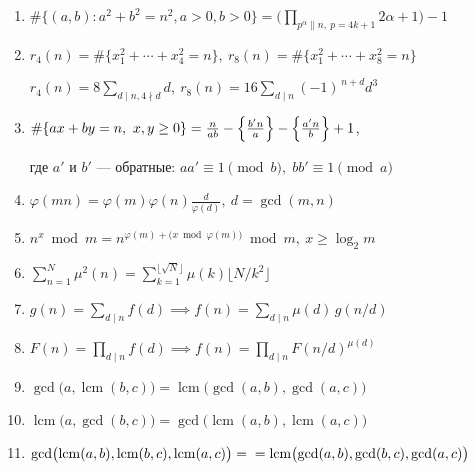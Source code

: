 \begin{enumerate}
\item %
$\displaystyle \#\{(a,b):a^2+b^2=n^2,a>0,b>0\}
=\Big(\prod_{p^\alpha\parallel n,\ p = 4k+1}2\alpha+1\Big)-1$

\item %
$r_4(n)=\#\{x_1^2+\cdots+x_4^2=n\},\ 
r_8(n)=\#\{x_1^2+\cdots+x_8^2=n\}$

$r_4(n)=8\sum_{d\mid n, 4\nmid d}d,\ 
r_8(n)=16\sum_{d\mid n}(-1)^{\,n+d}d^3$

\item %
$\#\{ax+by=n,\ x,y\ge0\}=\frac{n}{ab}-\Bigl\{\tfrac{b'n}{a}\Bigr\}-\Bigl\{\tfrac{a'n}{b}\Bigr\}+1$,

где $a'$ и $b'$ — обратные: $aa'\equiv1\pmod b,\; bb'\equiv1\pmod a$

\item %
$\varphi(mn)=\varphi(m)\varphi(n)\frac{d}{\varphi(d)},\  d=\gcd(m,n)$

\item %
$n^x\bmod m = n^{\varphi(m)+\bigl(x\bmod\varphi(m)\bigr)}\bmod m,\ x\ge\log_2 m$

\item %
$\sum_{n=1}^N\mu^2(n)=\sum_{k=1}^{\lfloor\sqrt N\rfloor}\mu(k)\bigl\lfloor N/k^2\bigr\rfloor$

\item %
$g(n)=\sum_{d\mid n}f(d) \implies f(n)=\sum_{d\mid n}\mu(d)\,g(n/d)$

\item %
$F(n)=\prod_{d\mid n}f(d) \implies f(n)=\prod_{d\mid n}F(n/d)^{\mu(d)}$

\item %
$\gcd\bigl(a,\operatorname{lcm}(b,c)\bigr)=\operatorname{lcm}\bigl(\gcd(a,b),\gcd(a,c)\bigr)$

\item %
$\operatorname{lcm}\bigl(a,\gcd(b,c)\bigr)=\gcd\bigl(\operatorname{lcm}(a,b),\operatorname{lcm}(a,c)\bigr)$

\item %
$\gcd\bigl(\operatorname{lcm}(a,b),\operatorname{lcm}(b,c),\operatorname{lcm}(a,c)\bigr)
 =\\= \operatorname{lcm}\bigl(\gcd(a,b),\gcd(b,c),\gcd(a,c)\bigr)$


\end{enumerate}
